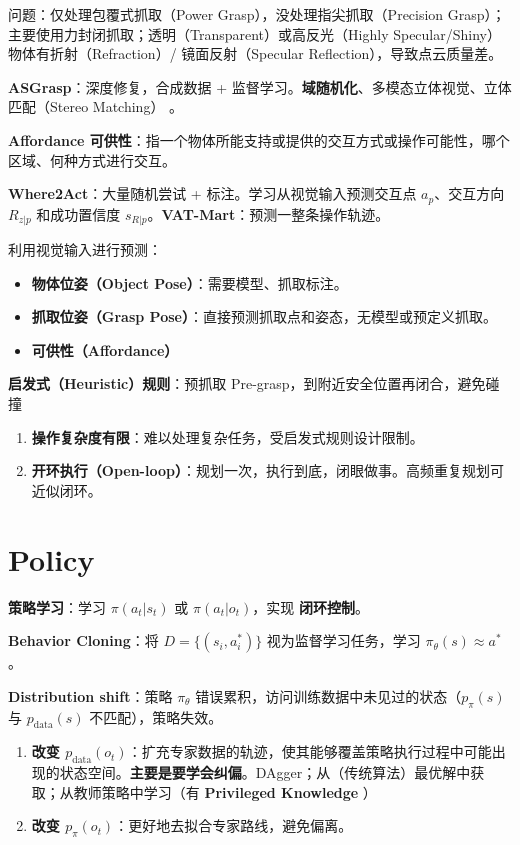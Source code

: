 \documentclass[
  8pt]{extarticle}
\providecommand{\tightlist}{%
  \setlength{\itemsep}{0pt}\setlength{\parskip}{0pt}}
\begin{document}
\begin{multicols*}{4}
问题：仅处理包覆式抓取（Power Grasp），没处理指尖抓取（Precision
Grasp）；主要使用力封闭抓取；透明（Transparent）或高反光（Highly
Specular/Shiny）物体有折射（Refraction）/ 镜面反射（Specular
Reflection），导致点云质量差。

\textbf{ASGrasp}：深度修复，合成数据 +
监督学习。\textbf{域随机化}、多模态立体视觉、立体匹配（Stereo Matching）
。

\textbf{Affordance
可供性}：指一个物体所能支持或提供的交互方式或操作可能性，哪个区域、何种方式进行交互。

\textbf{Where2Act}：大量随机尝试 + 标注。学习从视觉输入预测交互点
\(a_p\)、交互方向 \(R_{z|p}\) 和成功置信度
\(s_{R|p}\)。\textbf{VAT-Mart}：预测一整条操作轨迹。

利用视觉输入进行预测：

\begin{itemize}
\tightlist
\item
  \textbf{物体位姿（Object Pose）}：需要模型、抓取标注。
\item
  \textbf{抓取位姿（Grasp
  Pose）}：直接预测抓取点和姿态，无模型或预定义抓取。
\item
  \textbf{可供性（Affordance）}
\end{itemize}

\textbf{启发式（Heuristic）规则}：预抓取
Pre-grasp，到附近安全位置再闭合，避免碰撞

\begin{enumerate}
\def\labelenumi{\arabic{enumi}.}
\tightlist
\item
  \textbf{操作复杂度有限}：难以处理复杂任务，受启发式规则设计限制。
\item
  \textbf{开环执行（Open-loop）}：规划一次，执行到底，闭眼做事。高频重复规划可近似闭环。
\end{enumerate}

\hypertarget{policy}{%
\section{Policy}\label{policy}}

\textbf{策略学习}：学习 \(\pi(a_t|s_t)\) 或 \(\pi(a_t|o_t)\)，实现
\textbf{闭环控制}。

\textbf{Behavior Cloning}：将 \(D = \{(s_i, a_i^*)\}\)
视为监督学习任务，学习 \(\pi_\theta(s) \approx a^*\)。

\textbf{Distribution shift}：策略 \(\pi_\theta\)
错误累积，访问训练数据中未见过的状态（\(p_\pi(s)\) 与
\(p_{\text{data}}(s)\) 不匹配），策略失效。

\begin{enumerate}
\def\labelenumi{\arabic{enumi}.}
\tightlist
\item
  \textbf{改变
  \(p_{\text{data}}(o_t)\)}：扩充专家数据的轨迹，使其能够覆盖策略执行过程中可能出现的状态空间。\textbf{主要是要学会纠偏}。DAgger；从（传统算法）最优解中获取；从教师策略中学习（有
  \textbf{Privileged Knowledge} ）
\item
  \textbf{改变 \(p_{\pi}(o_t)\)}：更好地去拟合专家路线，避免偏离。
\end{enumerate}


\end{multicols*}
\end{document}
